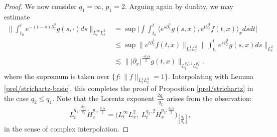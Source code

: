 \documentclass[10pt,a4paper]{amsart}
\begin{document}
\begin{proof}
    We now consider $q_1 = \infty$, $p_1 = 2$. Arguing again by duality, we may estimate
    \begin{align*}
        \bigg\|\int_{t_0}^t e^{-(t-s)\partial_x^3} g(s,\cdot) ds\bigg\|_{L_t^\infty L_x^2}
        & = \sup\bigg|\int \int_{t_0}^t\Big\langle  e^{s\partial_x^3} g(s,x),e^{t\partial_x^3}f(t,x)\Big\rangle_{x}dsdt\bigg| \\
        & \leq \sup\big\|e^{t\partial_x^3} f(t,x)\big\|_{L_t^1L_x^2}\bigg\|\int_{t_0}^t e^{s\partial_x^3}g(s,x)ds\bigg\|_{L_x^2} \\
        & \lesssim \Big\||\partial_x|^\frac{-\theta_2\alpha}{2} g(t,x) \Big\|_{L_t^{q_2',2}L_x^{p_2'}}.
    \end{align*}
    where the supremum is taken over $\{f : \|f\|_{L_t^1 L_x^2} = 1\}$. Interpolating with Lemma \ref{prel/strichartz-basic}, this completes the proof of Proposition \ref{prel/strichartz} in the case $q_2 \leq q_1$. Note that the Lorentz exponent $\frac{2q_1}{q_2}$ arises from the observation:
    \begin{equation*}
        L_t^{q_1,\frac{2q_1}{q_2}}\dot{H}_x^{p_1,\frac{\theta_1\alpha}{2}} = \Big( L_t^\infty L_x^2,\;L_t^{q_2,2}\dot{H}_x^{p_2,\frac{\theta_2\alpha}{2}}\Big)_{\left[\frac{q_2}{q_1}\right]},
    \end{equation*}
    in the sense of complex interpolation.
\end{proof}
\end{document}
